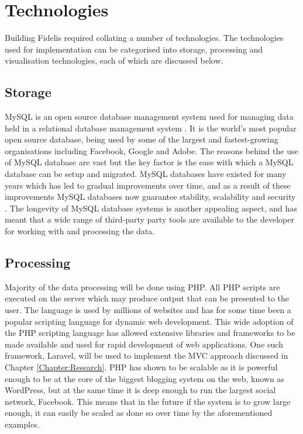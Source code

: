 \section{Technologies}
Building Fidelis required collating a number of technologies. The technologies used for implementation can be categorised into storage, processing and visualisation technologies, each of which are discussed below.

\subsection{Storage}
MySQL is an open source database management system used for managing data held in a relational database management system \cite{MySQL:Home}. It is the world's most popular open source database, being used by some of the largest and fastest-growing organisations including Facebook, Google and Adobe. The reasons behind the use of MySQL database are vast but the key factor is the ease with which a MySQL database can be setup and migrated. MySQL databases have existed for many years which has led to gradual improvements over time, and as a result of these improvements MySQL databases now guarantee stability, scalability and security \cite{MySQL:Why}. The longevity of MySQL database systems is another appealing aspect, and has meant that a wide range of third-party party tools are available to the developer for working with and processing the data. 

\subsection{Processing}
Majority of the data processing will be done using PHP. All PHP scripts are executed on the server which may produce output that can be presented to the user. The language is used by millions of websites and has for some time been  a popular scripting language for dynamic web development. This wide adoption of the PHP scripting language has allowed extensive libraries and frameworks to be made available and used for rapid development of web applications. One such framework, Laravel, will be used to implement the MVC approach discussed in Chapter \ref{Chapter:Research}. PHP has shown to be scalable as it is powerful enough to be at the core of the biggest blogging system on the web, known as WordPress, but at the same time it is deep enough to run the largest social network, Facebook\cite{W3Schools:PHP_Intro, Wiki:WordPress, Fastcompany:Facebook_PHP}. This means that in the future if the system is to grow large enough, it can easily be scaled as done so over time by the aforementioned examples. 

